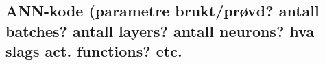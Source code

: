 \subsection{ANN-kode (parametre brukt/prøvd? antall batches? antall layers? antall neurons? hva slags act. functions? etc.}